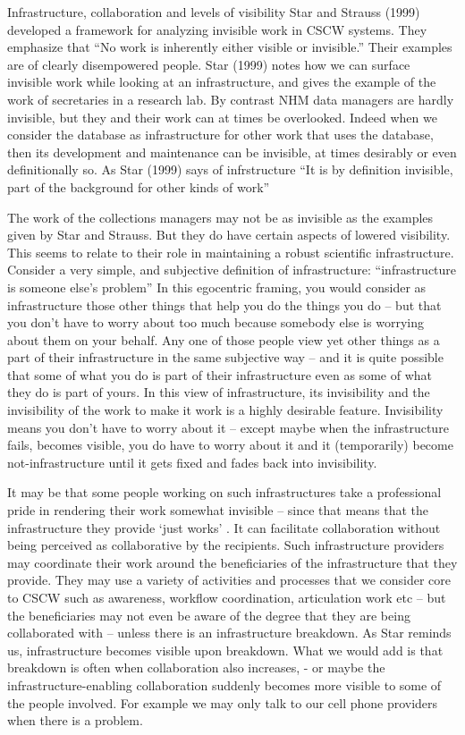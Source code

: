Infrastructure, collaboration and levels of visibility
Star and Strauss (1999) developed a framework for analyzing invisible work in CSCW systems. They emphasize that “No work is inherently either visible or invisible.” Their examples are of clearly disempowered people. Star (1999) notes how we can surface invisible work while looking at an infrastructure, and gives the example of the work of secretaries in a research lab. By contrast NHM data managers are hardly invisible, but they and their work can at times be overlooked. Indeed when we consider the database as infrastructure for other work that uses the database, then its development and maintenance can be invisible, at times desirably or even definitionally so. As Star (1999) says of infrstructure “It is by definition invisible, part of the background for other kinds of work” 

The work of the collections managers may not be as invisible as the examples given by Star and Strauss. But they do have certain aspects of lowered visibility. This seems to relate to their role in maintaining a robust scientific infrastructure. Consider a very simple, and subjective definition of infrastructure: “infrastructure is someone else’s problem” In this egocentric framing, you would consider as infrastructure those other things that help you do the things you do – but that you don’t have to worry about too much because somebody else is worrying about them on your behalf. Any one of those people view yet other things as a part of their infrastructure in the same subjective way – and it is quite possible that some of what you do is part of their infrastructure even as some of what they do is part of yours. In this view of infrastructure, its invisibility and the invisibility of the work to make it work is a highly desirable feature. Invisibility means you don’t have to worry about it – except maybe when the infrastructure fails, becomes visible, you do have to worry about it and it (temporarily) become not-infrastructure until it gets fixed and fades back into invisibility.

It may be that some people working on such infrastructures take a professional pride in rendering their work somewhat invisible – since that means that the infrastructure they provide ‘just works’ . It can facilitate collaboration without being perceived as collaborative by the recipients. Such infrastructure providers may coordinate their work around the beneficiaries of the infrastructure that they provide. They may use a variety of activities and processes that we consider core to CSCW such as awareness, workflow coordination, articulation work etc – but the beneficiaries may not even be aware of the degree that they are being collaborated with – unless there is an infrastructure breakdown. As Star reminds us, infrastructure becomes visible upon breakdown. What we would add is that breakdown is often when collaboration also increases, - or maybe the infrastructure-enabling collaboration suddenly becomes more visible to some of the people involved. For example we may only talk to our cell phone providers when there is a problem.

